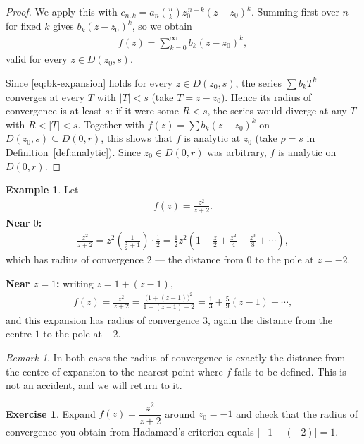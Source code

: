 \documentclass[11pt]{article}
\theoremstyle{plain}
\theoremstyle{definition}
\newtheorem{example}[theorem]{Example}
\newtheorem{exercise}[theorem]{Exercise}
\theoremstyle{remark}
\newtheorem*{remark}{Remark}
\numberwithin{equation}{section}
\newcommand{\be}{\begin{eqnarray}}
\newcommand{\ee}{\end{eqnarray}}
\begin{document}
\begin{proof}
We apply this with $c_{n,k}=a_n\binom nk z_0^{\,n-k}(z-z_0)^k$. Summing
first over $n$ for fixed $k$ gives $b_k(z-z_0)^k$, so we obtain
\be
 f(z)=\sum_{k=0}^{\infty}b_k(z-z_0)^k,
 \label{eq:bk-expansion}
\ee
valid for every $z\in D(z_0,s)$.

Since \eqref{eq:bk-expansion} holds for every $z\in D(z_0,s)$, the series
$\sum b_kT^k$ converges at every $T$ with $|T|<s$ (take $T=z-z_0$). Hence
its radius of convergence is at least $s$: if it were some $R<s$, the series
would diverge at any $T$ with $R<|T|<s$. Together with
$f(z)=\sum b_k(z-z_0)^k$ on $D(z_0,s)\subseteq D(0,r)$, this shows that $f$
is analytic at $z_0$ (take $\rho=s$ in Definition~\ref{def:analytic}). Since $z_0\in D(0,r)$
was arbitrary, $f$ is analytic on $D(0,r)$.
\end{proof}

\begin{example}
Let
\be
 f(z)=\frac{z^2}{z+2}.
\ee
\textbf{Near $0$:}
\be
 \frac{z^2}{z+2}=z^2\left(\frac1{\frac z2+1}\right)\cdot\frac12
 =\frac12z^2\left(1-\frac z2+\frac{z^2}4-\frac{z^3}8+\cdots\right),
\ee
which has radius of convergence $2$ --- the distance from $0$ to the pole at
$z=-2$.

\textbf{Near $z=1$:} writing $z=1+(z-1)$,
\be
 f(z)=\frac{z^2}{z+2}=\frac{\bigl(1+(z-1)\bigr)^2}{1+(z-1)+2}
 =\frac13+\frac59(z-1)+\cdots,
\ee
and this expansion has radius of convergence $3$, again the distance from
the centre $1$ to the pole at $-2$.
\end{example}

\noindent
\begin{minipage}[c]{0.42\textwidth}
\centering
{}
\end{minipage}\hfill
\begin{minipage}[c]{0.55\textwidth}
\begin{remark}
In both cases the radius of convergence is exactly the distance from the
centre of expansion to the nearest point where $f$ fails to be defined. This
is not an accident, and we will return to it.
\end{remark}
\end{minipage}

\begin{exercise}
Expand $f(z)=\dfrac{z^2}{z+2}$ around $z_0=-1$ and check that the radius of
convergence you obtain from Hadamard's criterion equals $|-1-(-2)|=1$.
\end{exercise}
\end{document}
